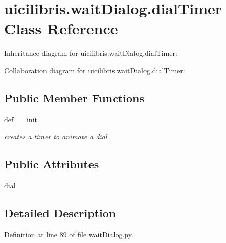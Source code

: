 \hypertarget{classuicilibris_1_1waitDialog_1_1dialTimer}{\section{uicilibris.\-wait\-Dialog.\-dial\-Timer \-Class \-Reference}
\label{classuicilibris_1_1waitDialog_1_1dialTimer}
}


\-Inheritance diagram for uicilibris.\-wait\-Dialog.\-dial\-Timer\-:


\-Collaboration diagram for uicilibris.\-wait\-Dialog.\-dial\-Timer\-:
\subsection*{\-Public \-Member \-Functions}
\begin{DoxyCompactItemize}
\item 
def \hyperlink{classuicilibris_1_1waitDialog_1_1dialTimer_a4e35d02f861135b4651333cbb2a529a9}{\-\_\-\-\_\-init\-\_\-\-\_\-}
\begin{DoxyCompactList}\small\item\em creates a timer to animate a dial \end{DoxyCompactList}\end{DoxyCompactItemize}
\subsection*{\-Public \-Attributes}
\begin{DoxyCompactItemize}
\item 
\hyperlink{classuicilibris_1_1waitDialog_1_1dialTimer_a920091fc039700f280cd852b0e23a405}{dial}
\end{DoxyCompactItemize}


\subsection{\-Detailed \-Description}


\-Definition at line 89 of file wait\-Dialog.\-py.



